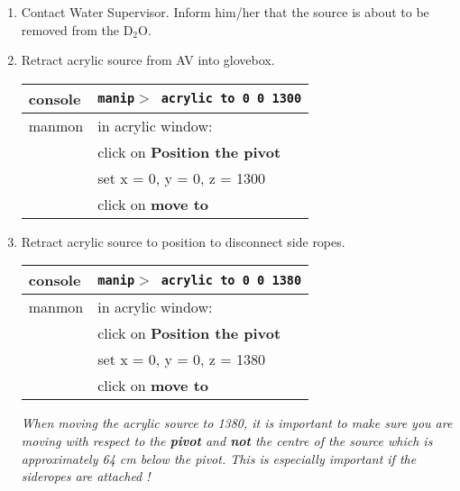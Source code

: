 \begin{enumerate}

\checkitem Take data. The exact configuration will vary. 


\begin{center}
                   {\bf Retracting Manipulator to glovebox}
\end{center}

\item\checkbox Contact Water Supervisor.  Inform him/her that the source is
   about to be removed from the D$_2$O.

\item\checkbox Retract acrylic source from AV into glovebox.
  \begin{center}
  \begin{tabular}{|l|l|}
  \hline
  console & {\tt manip$>$ acrylic to 0 0 1300} \\
  \hline
  manmon  & in acrylic window: \\
           & click on {\bf Position the pivot}\\
          & set x = 0, y = 0, z = 1300\\
          & click on {\bf move to} \\
  \hline
  \end{tabular}
  \end{center}
\item\checkbox Retract acrylic source to position to disconnect side ropes.
  \begin{center}
  \begin{tabular}{|l|l|}
  \hline
  console & {\tt manip$>$ acrylic to 0 0 1380} \\
  \hline
  manmon  & in acrylic window: \\
          & click on {\bf Position the pivot}\\
          & set x = 0, y = 0, z = 1380\\
          & click on {\bf move to} \\
  \hline
  \end{tabular}
  \end{center}
  \small
  {\em
    When moving the acrylic source to 1380, it is important to make sure
    you are moving with respect to the { \bf pivot } and  { \bf not } the
   centre of the source which is
    approximately 64 cm  below the pivot.  This is especially important if the sideropes
are attached !
}
  \normalsize






\end{enumerate}
